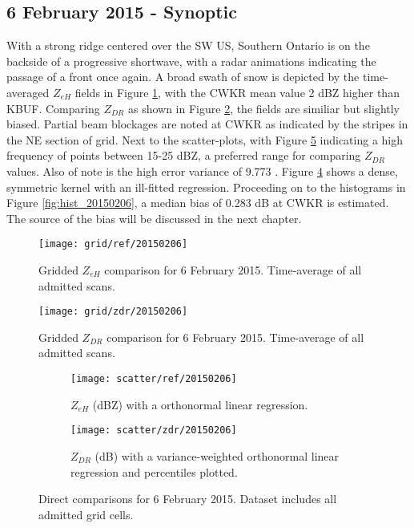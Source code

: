 \subsection{6 February 2015 - Synoptic}
With a strong ridge centered over the SW US, Southern Ontario is on the backside of a progressive shortwave, with a radar animations indicating the passage of a front once again. A
broad swath of snow is depicted by the time-averaged $Z_{eH}$ fields in Figure \ref{fig:grid_ref_20150206}, with the CWKR mean value 2 dBZ higher than KBUF.
Comparing $Z_{DR}$ as shown in Figure \ref{fig:grid_zdr_20150206}, the fields are similiar but slightly biased. Partial beam blockages are noted at CWKR as indicated
by the stripes in the NE section of grid. Next to the scatter-plots, with Figure \ref{fig:scatter_20150206} indicating a high frequency of points between 15-25 dBZ, a preferred range for comparing $Z_{DR}$ values. Also of note is the high error variance of 9.773 .
Figure \ref{fig:scatter_zdr_20150206} shows a dense, symmetric kernel with an ill-fitted regression. Proceeding on to the histograms in Figure
\ref{fig:hist_20150206}, a median bias of 0.283 dB at CWKR is estimated. The source of the bias will be discussed in the next chapter. 
\begin{figure}[H]
\texttt{[image: grid/ref/20150206]}
\caption{Gridded $Z_{eH}$ comparison for 6 February 2015. Time-average of all admitted scans.} 
\label{fig:grid_ref_20150206}
\end{figure}
\begin{figure}[H]
\texttt{[image: grid/zdr/20150206]}
\caption{Gridded $Z_{DR}$ comparison for 6 February 2015. Time-average of all admitted scans.} 
\label{fig:grid_zdr_20150206}
\end{figure}

\begin{figure}[H]
\centering
   \begin{subfigure}[t]{0.48\linewidth} \centering
     \texttt{[image: scatter/ref/20150206]}
     \caption{$Z_{eH}$ (dBZ) with a orthonormal linear regression.}\label{fig:scatter_ref_20150206}
   \end{subfigure}
   \begin{subfigure}[t]{0.48\linewidth} \centering
     \texttt{[image: scatter/zdr/20150206]}
     \caption{$Z_{DR}$ (dB) with a variance-weighted orthonormal linear regression and percentiles plotted.}\label{fig:scatter_zdr_20150206}
   \end{subfigure}
\caption{Direct comparisons for 6 February 2015. Dataset includes all admitted grid cells.} \label{fig:scatter_20150206}
\end{figure}


